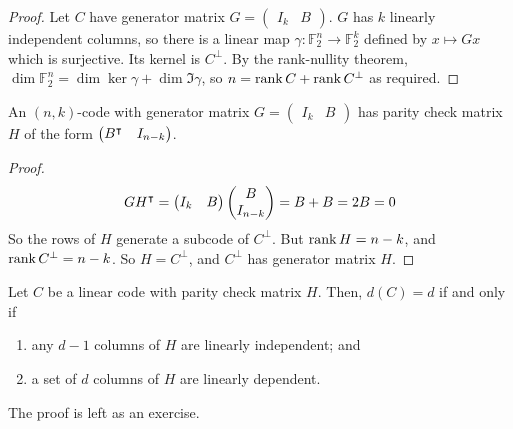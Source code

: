 \begin{proof}
    Let \( C \) have generator matrix \( G = \begin{pmatrix}
        I_k & B
    \end{pmatrix} \).
    \( G \) has \( k \) linearly independent columns, so there is a linear map \( \gamma \colon \mathbb F_2^n \to \mathbb F_2^k \) defined by \( x \mapsto Gx \) which is surjective.
    Its kernel is \( C^\perp \).
    By the rank-nullity theorem, \( \dim \mathbb F_2^n = \dim \ker \gamma + \dim \Im \gamma \), so \( n = \rank C + \rank C^\perp \) as required.
\end{proof}
\begin{lemma}
    An \( (n, k) \)-code with generator matrix \( G = \begin{pmatrix}
        I_k & B
    \end{pmatrix} \) has parity check matrix \( H \) of the form \( \begin{pmatrix}
        B^\intercal & I_{n-k}
    \end{pmatrix} \).
\end{lemma}
\begin{proof}
    \[ GH^\intercal = \begin{pmatrix}
        I_k & B
    \end{pmatrix} \begin{pmatrix}
        B \\
        I_{n-k}
    \end{pmatrix} = B + B = 2B = 0 \]
    So the rows of \( H \) generate a subcode of \( C^\perp \).
    But \( \rank H = n - k \), and \( \rank C^\perp = n - k \).
    So \( H = C^\perp \), and \( C^\perp \) has generator matrix \( H \).
\end{proof}
\begin{lemma}
    Let \( C \) be a linear code with parity check matrix \( H \).
    Then, \( d(C) = d \) if and only if
    \begin{enumerate}
        \item any \( d - 1 \) columns of \( H \) are linearly independent; and
        \item a set of \( d \) columns of \( H \) are linearly dependent.
    \end{enumerate}
\end{lemma}
The proof is left as an exercise.

